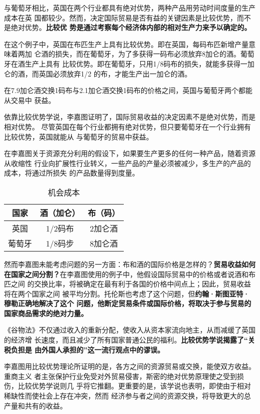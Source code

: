 与葡萄牙相比，英国在两个行业都具有绝对优势，两种产品用劳动时间度量的生产成本在英
国都较少。然而，决定国际贸易是否有益的关键因素是比较优势，而不是绝对优势。\textbf{比较优
势是通过考察每个经济体内部的相对生产力来予以确定的。}

在这个例子中，英国在布匹生产上具有比较优势。即在英国，每码布匹新增产量意味着两加
仑酒的损失，而在葡萄牙，为了多获得一码布必须放弃8加仑的酒。葡萄牙在酒生产上具有
比较优势。即在葡萄牙，只用1/8码布的损失，就能多获得一加仑的酒，而英国必须放弃1/2
的布，才能生产出一加仑的酒。

在7.9加仑酒交换1码布与2.1加仑酒交换1码布的价格之间，英国与葡萄牙两个都能从交易中
获益。

依靠比较优势学说，李嘉图证明了，国际贸易收益的决定因素不是绝对优势，而是相对优势。
尽管英国在每个行业都拥有绝对优势，但只要葡萄牙在一个行业拥有比较优势，英国就能从
与葡萄牙的贸易中获益。

在李嘉图关于资源充分利用的假设下，如果要生产更多的任何一种产品，随着资源从收缩性
行业向扩展性行业转义，一些产品的产量必须被减少，多生产的产品的成本，将通过所损失
的产品数量得到度量。

\begin{table}[htbp]
  \centering
  \caption{机会成本}
  \label{tab:机会成本}
    \begin{tabular}{@{}ccc@{}}
      \toprule
      \textbf{国家} & \textbf{酒（加仑）} & \textbf{布（码）}   \\ \midrule
      英国 & 1/2码布 & 2加仑酒   \\
      葡萄牙& 1/8码步 &  8加仑酒  \\ \bottomrule
    \end{tabular}%
\end{table}

然而李嘉图未能考虑问题的另一方面：布和酒的国际价格是怎样的？\textbf{贸易收益如何
  在国家之间分割？}在李嘉图使用的例子中，他假设国际贸易中的价格或者说酒和布匹之间
的交换比率，将被确定在最有利于各国的价格中间点上；因此，贸易收益将在两个国家之间
被平均分割。托伦斯也考虑了这个问题，但\textbf{约翰·斯图亚特·穆勒正确地解决了这个
  问题，他断定贸易条件或国际价格，将取决于参与贸易的国家商品需求的绝对力量。}

《谷物法》不仅通过收入的重新分配，使收入从资本家流向地主，从而减缓了英国的经济增
长速度，而且减少了所有国家普通公民的福利。\textbf{比较优势学说揭露了“关税负担是
  由外国人承担的”这一流行观点中的谬误。}

李嘉图用比较优势理论所证明的是，各方之间的资源贸易或交换，能使双方收益。重商主义
者主张保护行业免受对外贸易侵害，斯密的绝对优势原理使之受到损伤，比较优势学说则几
乎将它推翻。更重要的是，该学说也表明，即使由于相对稀缺性而使社会上存在冲突，然而
经济参与者之间的资源交换，将导致更大的总产量和共有的收益。

